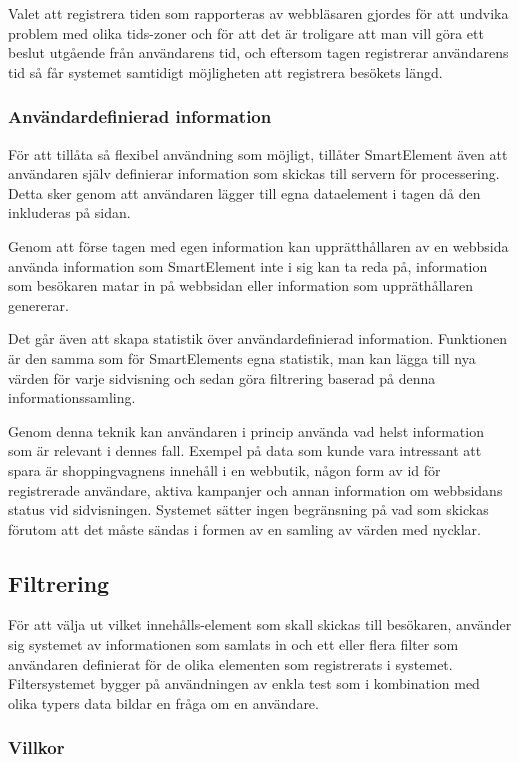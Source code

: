 Valet att registrera tiden som rapporteras av webbläsaren gjordes för att undvika problem med olika tids-zoner och för att det är troligare att man vill göra ett beslut utgående från användarens tid, och eftersom tagen registrerar användarens tid så får systemet samtidigt möjligheten att registrera besökets längd.

\subsubsection{Användardefinierad information}

För att tillåta så flexibel användning som möjligt, tillåter SmartElement även att användaren själv definierar information som skickas till servern för processering. Detta sker genom att användaren lägger till egna dataelement i tagen då den inkluderas på sidan.

Genom att förse tagen med egen information kan upprätthållaren av en webbsida använda information som SmartElement inte i sig kan ta reda på, information som besökaren matar in på webbsidan eller information som uppräthållaren genererar.

Det går även att skapa statistik över användardefinierad information. Funktionen är den samma som för SmartElements egna statistik, man kan lägga till nya värden för varje sidvisning och sedan göra filtrering baserad på denna informationssamling.

Genom denna teknik kan användaren i princip använda vad helst information som är relevant i dennes fall. Exempel på data som kunde vara intressant att spara är shoppingvagnens innehåll i en webbutik, någon form av id för registrerade användare, aktiva kampanjer och annan information om webbsidans status vid sidvisningen. Systemet sätter ingen begränsning på vad som skickas förutom att det måste sändas i formen av en samling av värden med nycklar.

\subsection{Filtrering}


För att välja ut vilket innehålls-element som skall skickas till besökaren, använder sig systemet av informationen som samlats in och ett eller flera filter som användaren definierat för de olika elementen som registrerats i systemet. Filtersystemet bygger på användningen av enkla test som i kombination med olika typers data bildar en fråga om en användare.

\subsubsection{Villkor}

